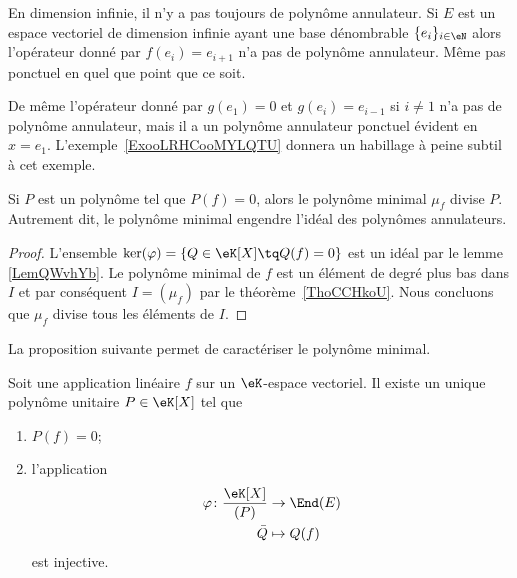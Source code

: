 \begin{example}       \label{ExooDTUJooIMqSKn}
    En dimension infinie, il n'y a pas toujours de polynôme annulateur. Si \( E\) est un espace vectoriel de dimension infinie ayant une base dénombrable \( \{ e_i \}_{i\in \eN}\) alors l'opérateur donné par \( f(e_i)=e_{i+1}\) n'a pas de polynôme annulateur. Même pas ponctuel en quel que point que ce soit.

    De même l'opérateur donné par \( g(e_1)=0\) et \( g(e_i)=e_{i-1}\) si \( i\neq 1\) n'a pas de polynôme annulateur, mais il a un polynôme annulateur ponctuel évident en \( x=e_1\). L'exemple~\ref{ExooLRHCooMYLQTU} donnera un habillage à peine subtil à cet exemple.
\end{example}

\begin{proposition}     \label{PropAnnncEcCxj}
    Si \( P\) est un polynôme tel que \( P(f)=0\), alors le polynôme minimal \( \mu_f\) divise \( P\). Autrement dit, le polynôme minimal engendre l'idéal des polynômes annulateurs.
\end{proposition}

\begin{proof}
    L'ensemble \( \ker(\varphi)=\{ Q\in \eK[X]\tq Q(f)=0 \} \) est un idéal par le lemme \ref{LemQWvhYb}. Le polynôme minimal de \( f\) est un élément de degré plus bas dans \( I\) et par conséquent \( I=(\mu_f)\) par le théorème~\ref{ThoCCHkoU}. Nous concluons que \( \mu_f\) divise tous les éléments de \( I\).
\end{proof}

La proposition suivante permet de caractériser le polynôme minimal.
\begin{proposition}      \label{PROPooVUJPooMzxzjE}
    Soit une application linéaire \( f\) sur un \( \eK\)-espace vectoriel. Il existe un unique polynôme unitaire \( P\in \eK[X]\) tel que
    \begin{enumerate}
        \item
            \( P(f)=0\);
        \item
            l'application
            \begin{equation}        \label{EQooIBMDooVTaEhf}
                \begin{aligned}
                    \varphi\colon \frac{ \eK[X] }{ (P) }&\to \End(E) \\
                    \bar Q&\mapsto Q(f)
                \end{aligned}
            \end{equation}
            est injective.
    \end{enumerate}
\end{proposition}

